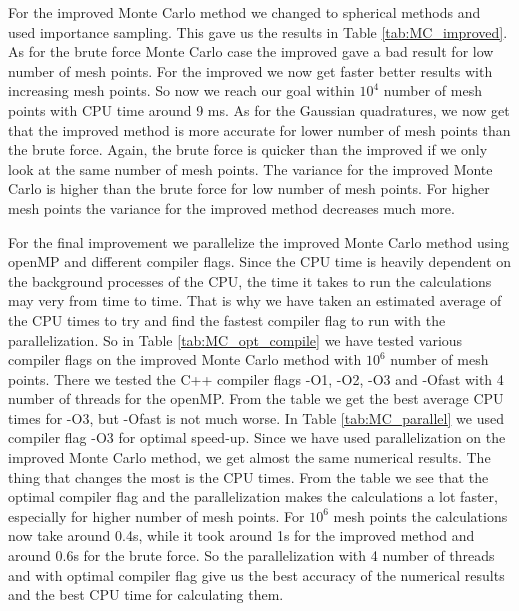 \documentclass[12pt,a4paper,english]{article}
\begin{document}
For the improved Monte Carlo method we changed to spherical methods and used importance sampling. This gave us the results in Table \ref{tab:MC_improved}. As for the brute force Monte Carlo case the improved gave a bad result for low number of mesh points. For the improved we now get faster better results with increasing mesh points. So now we reach our goal within $10^4$ number of mesh points with CPU time around 9 ms. As for the Gaussian quadratures, we now get that the improved method is more accurate for lower number of mesh points than the brute force. Again, the brute force is quicker than the improved if we only look at the same number of mesh points. The variance for the improved Monte Carlo is higher than the brute force for low number of mesh points. For higher mesh points the variance for the improved method decreases much more.

For the final improvement we parallelize the improved Monte Carlo method using openMP and different compiler flags. Since the CPU time is heavily dependent on the background processes of the CPU, the time it takes to run the calculations may very from time to time. That is why we have taken an estimated average of the CPU times to try and find the fastest compiler flag to run with the parallelization. So in Table \ref{tab:MC_opt_compile} we have tested various compiler flags on the improved Monte Carlo method with $10^6$ number of mesh points. There we tested the C++ compiler flags -O1, -O2, -O3 and -Ofast with 4 number of threads for the openMP. From the table we get the best average CPU times for -O3, but -Ofast is not much worse. In Table \ref{tab:MC_parallel} we used compiler flag -O3 for optimal speed-up. Since we have used parallelization on the improved Monte Carlo method, we get almost the same numerical results. The thing that changes the most is the CPU times. From the table we see that the optimal compiler flag and the parallelization makes the calculations a lot faster, especially for higher number of mesh points. For $10^6$ mesh points the calculations now take around 0.4s, while it took around 1s for the improved method and around 0.6s for the brute force. So the parallelization with 4 number of threads and with optimal compiler flag give us the best accuracy of the numerical results and the best CPU time for calculating them.
\end{document}
